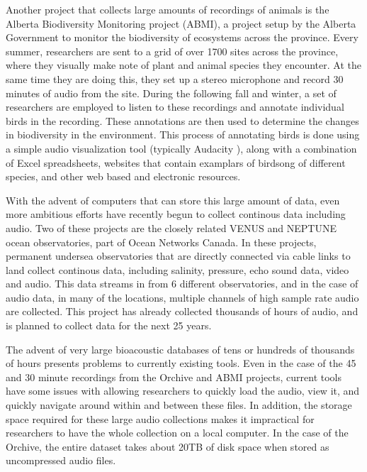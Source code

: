 \documentclass[12pt,oneside]{book}
\begin{document}
Another project that collects large amounts of recordings of animals
is the Alberta Biodiversity Monitoring project (ABMI), a project setup
by the Alberta Government to monitor the biodiversity of ecosystems
across the province.  Every summer, researchers are sent to a grid of
over 1700 sites across the province, where they visually make note of
plant and animal species they encounter.  At the same time they are
doing this, they set up a stereo microphone and record 30 minutes of
audio from the site.  During the following fall and winter, a set of
researchers are employed to listen to these recordings and annotate
individual birds in the recording.  These annotations are then used to
determine the changes in biodiversity in the environment.  This
process of annotating birds is done using a simple audio visualization
tool (typically Audacity \cite{audacity}), along with a combination of
Excel spreadsheets, websites that contain examplars of birdsong of
different species, and other web based and electronic resources.

With the advent of computers that can store this large amount of data,
even more ambitious efforts have recently begun to collect continous
data including audio.  Two of these projects are the closely related
VENUS and NEPTUNE ocean observatories, part of Ocean Networks Canada.
In these projects, permanent undersea observatories that are directly
connected via cable links to land collect continous data, including
salinity, pressure, echo sound data, video and audio.  This data
streams in from 6 different observatories, and in the case of audio
data, in many of the locations, multiple channels of high sample rate
audio are collected.  This project has already collected thousands of
hours of audio, and is planned to collect data for the next 25 years.

The advent of very large bioacoustic databases of tens or hundreds of
thousands of hours presents problems to currently existing tools.
Even in the case of the 45 and 30 minute recordings from the Orchive
and ABMI projects, current tools have some issues with allowing
researchers to quickly load the audio, view it, and quickly navigate
around within and between these files.  In addition, the storage space
required for these large audio collections makes it impractical for
researchers to have the whole collection on a local computer.  In the
case of the Orchive, the entire dataset takes about 20TB of disk space
when stored as uncompressed audio files.
\end{document}
